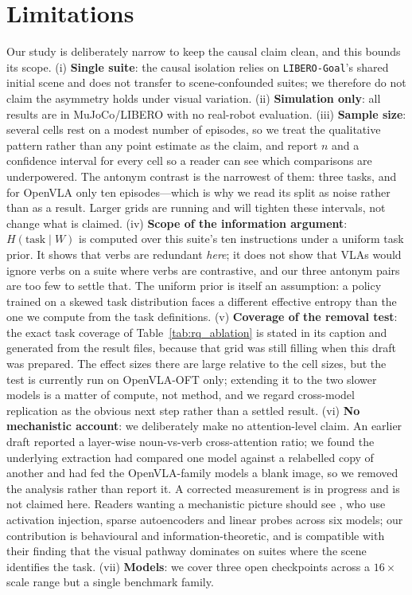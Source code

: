 \documentclass[11pt]{article}
\begin{document}
\section*{Limitations}
Our study is deliberately narrow to keep the causal claim clean, and this bounds
its scope. (i) \textbf{Single suite}: the causal isolation relies on
\texttt{LIBERO-Goal}'s shared initial scene and does not transfer to
scene-confounded suites; we therefore do not claim the asymmetry holds under
visual variation. (ii) \textbf{Simulation only}: all results are in MuJoCo/LIBERO
with no real-robot evaluation. (iii) \textbf{Sample size}: several cells rest on a
modest number of episodes, so we treat the qualitative pattern rather than any point
estimate as the claim, and report $n$ and a confidence interval for every cell so a
reader can see which comparisons are underpowered. The antonym contrast is the
narrowest of them: three tasks, and for OpenVLA only ten episodes---which is why we
read its split as noise rather than as a result. Larger grids are running and will
tighten these intervals, not change what is claimed. (iv) \textbf{Scope of the information argument}: $H(\text{task}\mid W)$ is
computed over this suite's ten instructions under a uniform task prior. It shows
that verbs are redundant \emph{here}; it does not show that VLAs would ignore
verbs on a suite where verbs are contrastive, and our three antonym pairs are too
few to settle that. The uniform prior is itself an assumption: a policy trained on a
skewed task distribution faces a different effective entropy than the one we compute
from the task definitions.
(v) \textbf{Coverage of the removal test}: the exact task coverage of
Table~\ref{tab:rq_ablation} is stated in its caption and generated from the result
files, because that grid was still filling when this draft was prepared. The effect
sizes there are large relative to the cell sizes, but the test is currently run on
OpenVLA-OFT only; extending it to the two slower models is a matter of compute, not
method, and we regard cross-model replication as the obvious next step rather than a
settled result. (vi) \textbf{No mechanistic account}: we deliberately make no
attention-level claim. An earlier draft reported a layer-wise noun-vs-verb
cross-attention ratio; we found the underlying extraction had compared one model
against a relabelled copy of another and had fed the OpenVLA-family models a blank
image, so we removed the analysis rather than report it. A corrected measurement is in
progress and is not claimed here. Readers wanting a mechanistic picture should see
\citet{grant2026features}, who use activation injection, sparse autoencoders and
linear probes across six models; our contribution is behavioural and
information-theoretic, and is compatible with their finding that the visual pathway
dominates on suites where the scene identifies the task. (vii) \textbf{Models}: we cover three open
checkpoints across a $16\times$ scale range but a single benchmark family.
\end{document}
